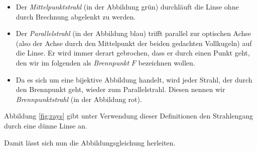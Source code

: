 \documentclass[a4paper,german,12pt,smallheadings]{scrartcl}
\begin{document}
\begin{itemize}
  \item Der \textit{Mittelpunktstrahl} (in der Abbildung grün) durchläuft die
    Linse ohne durch Brechnung abgelenkt zu werden.
  \item Der \textit{Parallelstrahl} (in der Abbildung blau) trifft parallel zur
    optischen Achse (also der Achse durch den Mittelpunkt der beiden gedachten
    Vollkugeln) auf die Linse. Er wird immer derart gebrochen, dass er durch
    einen Punkt geht, den wir im folgenden als \textit{Brennpunkt} $F$
    bezeichnen wollen.
  \item Da es sich um eine bijektive Abbildung handelt, wird jeder Strahl, der
    durch den Brennpunkt geht, wieder zum Parallelstrahl. Diesen nennen wir
    \textit{Brennpunktstrahl} (in der Abbildung rot).
\end{itemize}

Abbildung \ref{fig:rays} gibt unter Verwendung dieser Definitionen den Strahlengang durch
eine dünne Linse an.

Damit lässt sich nun die Abbildungsgleichung herleiten.
\end{document}
